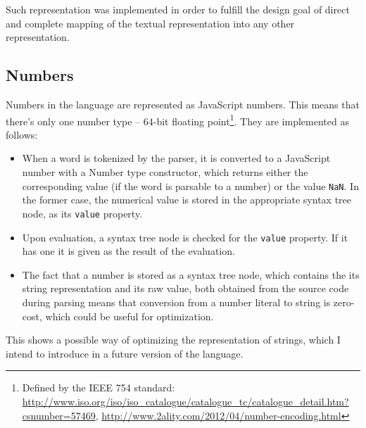 Such representation was implemented in order to fulfill the design goal of direct and complete mapping of the textual representation into any other representation.

\subsection{Numbers}
Numbers in the language are represented as JavaScript numbers. This means that there's only one number type -- 64-bit floating point\footnote{Defined by the IEEE 754 standard: \url{http://www.iso.org/iso/iso_catalogue/catalogue_tc/catalogue_detail.htm?csnumber=57469}, \url{http://www.2ality.com/2012/04/number-encoding.html}}. They are implemented as follows:
\begin{itemize}
    \item When a word is tokenized by the parser, it is converted to a JavaScript number with a Number type constructor, which returns either the corresponding value (if the word is parsable to a number) or the value \texttt{NaN}. In the former case, the numerical value is stored in the appropriate syntax tree node, as its \texttt{value} property.
    \item Upon evaluation, a syntax tree node is checked for the \texttt{value} property. If it has one it is given as the result of the evaluation.
    \item The fact that a number is stored as a syntax tree node, which contains the its string representation and its raw value, both obtained from the source code during parsing means that conversion from a number literal to string is zero-cost, which could be useful for optimization.
\end{itemize}

This shows a possible way of optimizing the representation of strings, which I intend to introduce in a future version of the language.

